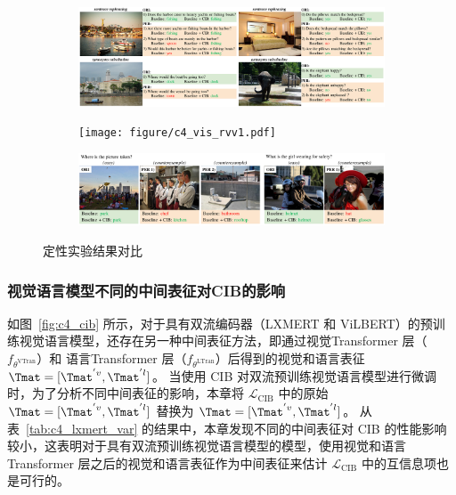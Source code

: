 \begin{figure}[!t] 
\begin{subfigure}[b]{1.0\textwidth}
\centering
\includegraphics[width=0.99\linewidth]{figure/c4_vis_rlv1.pdf}
\label{fig:vis_lv}
\end{subfigure}
\begin{subfigure}[b]{\linewidth}
\texttt{[image: figure/c4\_vis\_rvv1.pdf]}
\label{fig:vis_vv}
\end{subfigure}
\begin{subfigure}[b]{\linewidth}
\includegraphics[width=0.99\linewidth]{figure/c4_vis_rscl1.pdf}
\label{fig:vis_sc}
\end{subfigure}
\vspace{-6mm}
\caption{定性实验结果对比}
\label{fig:vis_example}
\vspace{-4mm}
\end{figure}


\subsubsection{视觉语言模型不同的中间表征对CIB的影响}
如图~\ref{fig:c4_cib} 所示，对于具有双流编码器（LXMERT 和 ViLBERT）的预训练视觉语言模型，还存在另一种中间表征方法，即通过视觉Transformer 层（$f_{\theta^{\text{VTran}}}$）和 语言Transformer 层（$f_{\theta^{\text{LTran}}}$）后得到的视觉和语言表征 $\Tmat=[\Tmat^{'v}, \Tmat^{'l}]$。
当使用 CIB 对双流预训练视觉语言模型进行微调时，为了分析不同中间表征的影响，本章将 $\mathcal{L}_{\text{CIB}}$ 中的原始 $\Tmat=[\Tmat^{'v}, \Tmat^{'l}]$ 替换为 $\Tmat=[\Tmat^{'v}, \Tmat^{'l}]$。
从表~\ref{tab:c4_lxmert_var} 的结果中，本章发现不同的中间表征对 CIB 的性能影响较小，这表明对于具有双流预训练视觉语言模型的模型，使用视觉和语言 Transformer 层之后的视觉和语言表征作为中间表征来估计 $\mathcal{L}_{\text{CIB}}$ 中的互信息项也是可行的。



